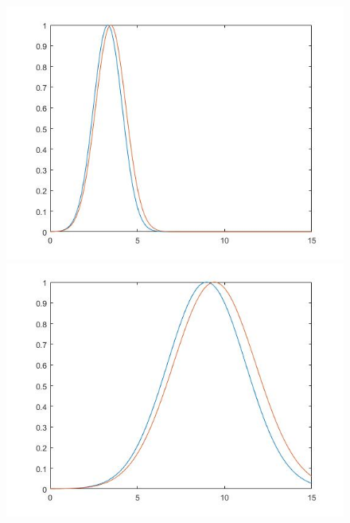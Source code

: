 \begin{figure}[!htb]
\begin{minipage}{0.45\textwidth}
\includegraphics[width = \textwidth]{5(b)(3).jpg}
\end{minipage}
\begin{minipage}{0.45\textwidth}
\includegraphics[width = \textwidth]{5(b)(4).jpg}
\end{minipage} \\

\end{figure}
